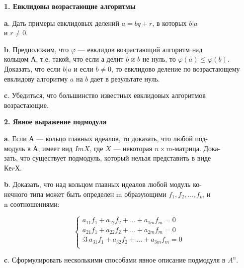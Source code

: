 \documentclass{../template/mai_book}
\begin{document}
{\noindent \bf 1. Евклидовы возрастающие алгоритмы} 

\medskip

{\bf a}. Дать примеры евклидовых делений $a = bq + r$, в которых $b | a$ \\
и $r\ne 0$. 

\medskip

{\bf b}. Предположим, что $\varphi$ — евклидов возрастающий алгоритм над\\ 
кольцом А, т.е. такой, что если а делит $b$ и $b$ не нуль, то $\varphi(a)  \leqslant \varphi(b)$. 
Доказать, что если $b | a$ и если $b\ne 0$, то евклидово деление по 
возрастающему евклидову алгоритму $a$ на $b$ дает в результате нуль. 

\medskip

{\bf c}. Убедиться, что большинство известных евклидовых алгоритмов\\ 
возрастающие. 

\medskip

{\noindent \bf 2. Явное выражение подмодуля} 

\medskip

{\bf a}. Если $А$ — кольцо главных идеалов, то доказать, что любой 
под-\\модуль в $А$, имеет вид $ImX$, где $X$ — некоторая $n \times m$-матрица. 
Дока-\\зать, что существует подмодуль, который нельзя представить в виде\\ 
$КеrХ$. 

\medskip

{\bf b}. Доказать, что над кольцом главных идеалов любой модуль 
ко-\\нечного типа может быть определен m образующими $f_1,f_2,...,f_m$ и\\ 
n соотношениями: 

\begin{equation}
\left\{\begin{gathered}
a_{11}f_1 + a_{12}f_2 + ... + a_{1m}f_m = 0\\
a_{21}f_1 + a_{22}f_2 + ... + a_{2m}f_m = 0\\
\vdots3\
a_{31}f_1 + a_{32}f_2 + ... + a_{3m}f_m = 0\\
\end{gathered}\right.
\end{equation}

\medskip

{\bf c}. Сформулировать несколькими способами явное описание 
подмодуля в $A^n$. 
\end{document}
